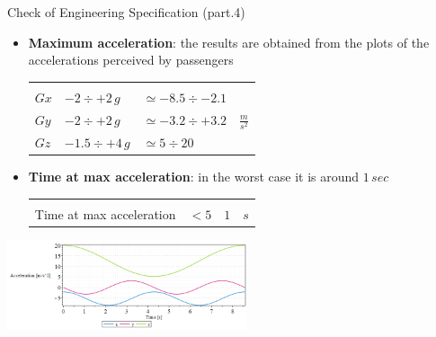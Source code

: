 \documentclass{beamer}              %
\begin{document}
	\begin{frame}{Check of Engineering Specification (part.4)}
		\begin{itemize}
			\scriptsize
			\item \textbf{Maximum acceleration}: the results are obtained from the plots of the accelerations perceived by passengers
			\begin{center}
				\begin{tabular}{p{4 cm} p{2 cm} p{1.8 cm} p{0.5 cm}}
					\textbf{} &\textbf{} &\textbf{} & \\						
					\centering $Gx$ & $-2\div+2\,g$ & $\simeq-8.5\div-2.1$ & \\ 
					\centering $Gy$ & $-2\div+2\,g$ & $\simeq-3.2\div+3.2$ & $\frac{m}{s^{2}}$ \\
					\centering $Gz$ & $-1.5\div+4\,g$ & $\simeq5\div20$ & \\
					\midrule
				\end{tabular}
			\end{center}
			
			\medskip 
			
			\item \textbf{Time at max acceleration}: in the worst case it is around $1 \, sec$ 
			\begin{center}
				\begin{tabular}{p{4 cm} p{2 cm} p{1.8 cm} p{0.5 cm}}
					\textbf{} &\textbf{} &\textbf{} & \\							
					\centering Time at max acceleration & $<5$ & $1$ & $s$ \\ 
					\midrule
				\end{tabular}
			\end{center}
		\end{itemize}
	
	\medskip
	
	\centering
	\includegraphics[width=200pt]{grafici/acc_pass_r.png}
	\end{frame}
\end{document}
